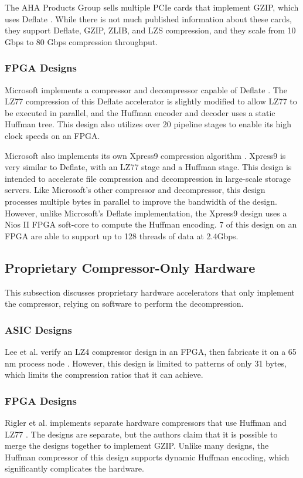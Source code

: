 \documentclass[doublespace,nopageskip]{VTthesis}
\begin{document}
The AHA Products Group sells multiple PCIe cards that implement GZIP, which uses Deflate \cite{aha}. While there is not much published information about these cards, they support Deflate, GZIP, ZLIB, and LZS compression, and they scale from 10 Gbps to 80 Gbps compression throughput.

\subsubsection{FPGA Designs}\label{sss:fpga_designs}

Microsoft implements a compressor and decompressor capable of Deflate \cite{microsoft}. The LZ77 compression of this Deflate accelerator is slightly modified to allow LZ77 to be executed in parallel, and the Huffman encoder and decoder uses a static Huffman tree. This design also utilizes over 20 pipeline stages to enable its high clock speeds on an FPGA.

Microsoft also implements its own Xpress9 compression algorithm \cite{xpress9}. Xpress9 is very similar to Deflate, with an LZ77 stage and a Huffman stage. This design is intended to accelerate file compression and decompression in large-scale storage servers. Like Microsoft's other compressor and decompressor, this design processes multiple bytes in parallel to improve the bandwidth of the design. However, unlike Microsoft's Deflate implementation, the Xpress9 design uses a Nios II FPGA soft-core to compute the Huffman encoding. 7 of this design on an FPGA are able to support up to 128 threads of data at 2.4Gbps.

\subsection{Proprietary Compressor-Only Hardware}\label{proprietary_compressor-only_hardware}
This subsection discusses proprietary hardware accelerators that only implement the compressor, relying on software to perform the decompression.

\subsubsection{ASIC Designs}\label{sss:asic_compressor_designs}
Lee et al. verify an LZ4 compressor design in an FPGA, then fabricate it on a 65 nm process node \cite{hardwarelz4}. However, this design is limited to patterns of only 31 bytes, which limits the compression ratios that it can achieve.

\subsubsection{FPGA Designs}\label{sss:fpga_compressor_designs}
Rigler et al. implements separate hardware compressors that use Huffman and LZ77 \cite{fpgahuffmanlz77}. The designs are separate, but the authors claim that it is possible to merge the designs together to implement GZIP. Unlike many designs, the Huffman compressor of this design supports dynamic Huffman encoding, which significantly complicates the hardware.
\end{document}
